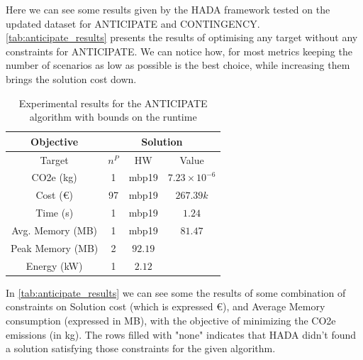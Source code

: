 \documentclass[a4paper,singleside,12pt]{report} %
\begin{document}
Here we can see some results given by the HADA framework tested on the updated dataset for ANTICIPATE and CONTINGENCY. \ref{tab:anticipate_results}
presents the results of optimising any target without any constraints for ANTICIPATE. We can notice how, for most metrics keeping the number of scenarios
as low as possible is the best choice, while increasing them brings the solution cost down.

\begin{table}[h!]
    \centering
    \begin{tabular}{c|ccc}
        \hline
        \multicolumn{1}{c|}{Objective} & \multicolumn{3}{c}{Solution} \\
        \hline
        Target & $n^P$ & HW & Value \\
        \hline
        CO2e (kg) & 1 & mbp19 & $7.23 \times 10^{-6}$ \\
        Cost (€) & 97 & mbp19 & $267.39k$ \\
        Time (s)& 1 & mbp19 & $1.24$ \\
        Avg. Memory (MB) & 1 & mbp19 & $81.47$ \\
        Peak Memory (MB) & 2 & $92.19$ \\
        Energy (kW) & 1 & $2.12$ \\
        \hline
    \end{tabular}
    \caption{Experimental results for the ANTICIPATE algorithm with bounds on the runtime}
    \label{tab:anticipate_min_targets}
\end{table}


In \ref{tab:anticipate_results} we can see some the results of some combination of constraints on Solution cost (which is
expressed €), and Average Memory consumption (expressed in MB), with the objective of minimizing the CO2e 
emissions (in kg). The rows filled with "none" indicates that HADA didn't found a solution satisfying those constraints for the
given algorithm.
\end{document}
